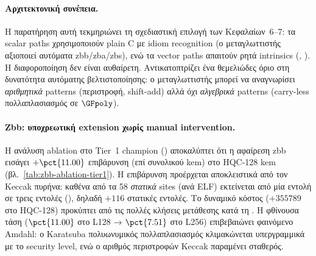 \paragraph{Αρχιτεκτονική συνέπεια.}
Η παρατήρηση αυτή τεκμηριώνει τη σχεδιαστική επιλογή των Κεφαλαίων~6–7:
τα scalar paths χρησιμοποιούν plain C με idiom recognition (ο μεταγλωττιστής
αξιοποιεί αυτόματα \gls{zbb}/\gls{zba}/\gls{zbs}), ενώ τα vector paths
απαιτούν ρητά intrinsics (,
). Η διαφοροποίηση δεν είναι
αυθαίρετη. Αντικατοπτρίζει ένα θεμελιώδες όριο στη δυνατότητα
αυτόματης βελτιστοποίησης: ο μεταγλωττιστής μπορεί να αναγνωρίσει
\emph{αριθμητικά} patterns (περιστροφή, shift-add) αλλά όχι
\emph{αλγεβρικά} patterns (carry-less πολλαπλασιασμός σε $\GFpoly$).

\paragraph{Zbb: υποχρεωτική extension χωρίς manual intervention.}
Η ανάλυση ablation στο Tier~1 champion () αποκαλύπτει
ότι η αφαίρεση \gls{zbb} εισάγει $+\pct{11.00}$ επιβάρυνση (επί συνολικού \gls{kem}) στο HQC-128 \gls{kem}
(βλ.\ \cref{tab:zbb-ablation-tier1}). Η επιβάρυνση προέρχεται
αποκλειστικά από τον Keccak πυρήνα: καθένα από τα \num{58} \emph{στατικά} \rori sites (ανά ELF) εκτείνεται από μία εντολή \rori σε τρεις εντολές
(), δηλαδή $+\num{116}$ στατικές εντολές. Το δυναμικό κόστος ($+\num{355789}$ \instret στο HQC-128) προκύπτει από τις πολλές κλήσεις μετάθεσης κατά τη \Decaps. Η φθίνουσα τάση ($\pct{11.00}$ στο L128 →
$\pct{7.51}$ στο L256) επιβεβαιώνει φαινόμενο Amdahl: ο Karatsuba
πολυωνυμικός πολλαπλασιασμός κλιμακώνεται υπεργραμμικά με το security
level, ενώ ο αριθμός περιστροφών Keccak παραμένει σταθερός.

